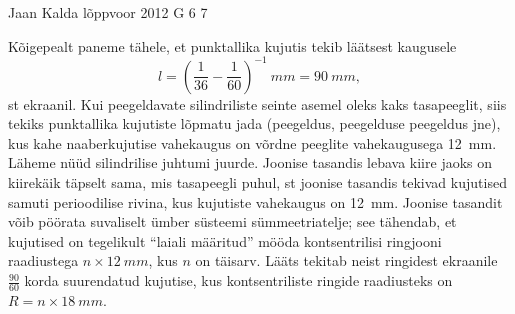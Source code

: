 \documentclass[11pt, twoside]{article}
\begin{document}
{{\begin{center}
\end{center}
\fi
}

{Jaan Kalda} %
{lõppvoor} %
{2012} %
{G 6} %
{7} %
{

\ifSolution
Kõigepealt paneme tähele, et punktallika kujutis tekib läätsest kaugusele
$$l=\left(\frac 1{36}-\frac 1{60}\right)^{-1}\SI{}{mm}=\SI{90}{mm},$$
st ekraanil. Kui peegeldavate silindriliste seinte asemel oleks kaks tasapeeglit, siis
tekiks punktallika kujutiste lõpmatu jada (peegeldus, peegelduse peegeldus jne), kus 
kahe naaberkujutise vahekaugus on võrdne peeglite vahekaugusega \SI{12}{mm}. 
Läheme nüüd silindrilise juhtumi juurde. Joonise tasandis lebava kiire jaoks on 
kiirekäik täpselt sama, mis tasapeegli puhul, st joonise tasandis tekivad kujutised samuti 
perioodilise rivina, kus kujutiste vahekaugus on \SI{12}{mm}. Joonise tasandit võib pöörata suvaliselt
ümber süsteemi sümmeetriatelje; see tähendab, et kujutised on tegelikult \enquote{laiali määritud} mööda kontsentrilisi
ringjooni raadiustega $n\times\SI{12}{mm}$, kus $n$ on täisarv. Lääts tekitab neist ringidest 
ekraanile $\frac{90}{60}$ korda suurendatud kujutise, 
kus kontsentriliste ringide raadiusteks on $R=n\times \SI{18}{mm}$.
\fi
}

}
\end{document}

